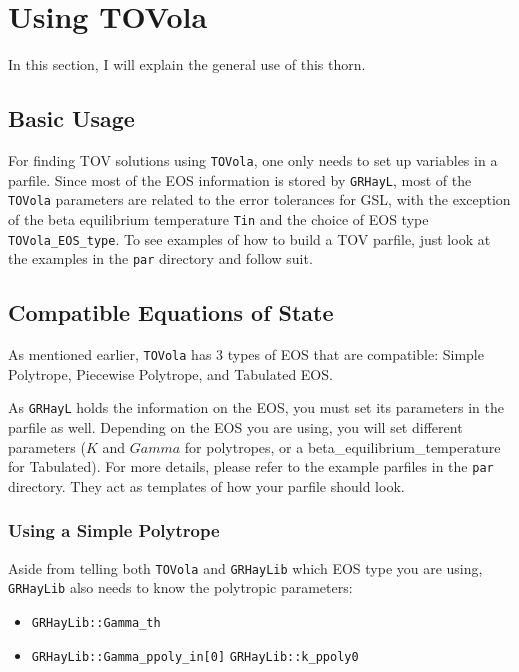 \section{Using TOVola}

In this section, I will explain the general use of this thorn. 

\subsection{Basic Usage}

For finding TOV solutions using \texttt{TOVola}, one only needs to set up variables in a parfile. Since most of the EOS information is stored by \texttt{GRHayL}, most of the \texttt{TOVola} parameters are related to the error tolerances for GSL, with the exception of the beta equilibrium temperature \texttt{Tin} and the choice of EOS type \texttt{TOVola\_EOS\_type}. To see examples of how to build a TOV parfile, just look at the examples in the \texttt{par} directory and follow suit.

\subsection{Compatible Equations of State}

As mentioned earlier, \texttt{TOVola} has 3 types of EOS that are compatible: Simple Polytrope, Piecewise Polytrope, and Tabulated EOS.

As \texttt{GRHayL}\cite{TOVola_TOVola_GRHayL} holds the information on the EOS, you must set its parameters in the parfile as well. Depending on the EOS you are using, you will set different parameters ($K$ and $Gamma$ for polytropes, or a beta\_equilibrium\_temperature for Tabulated). For more details, please refer to the example parfiles in the \texttt{par} directory. They act as templates of how your parfile should look.

\subsubsection{Using a Simple Polytrope}

Aside from telling both \texttt{TOVola} and \texttt{GRHayLib} which EOS type you are using, \texttt{GRHayLib} also needs to know the polytropic parameters:

\begin{itemize}
    \item \texttt{GRHayLib::Gamma\_th}
    \item \texttt{GRHayLib::Gamma\_ppoly\_in[0]}
    \teun \texttt{GRHayLib::k\_ppoly0}
\end{itemize}

